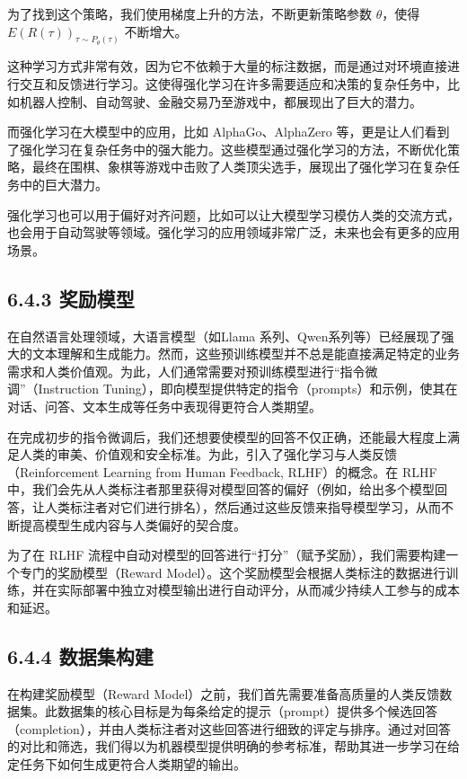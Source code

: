 \documentclass[
]{article}
\begin{document}
为了找到这个策略，我们使用梯度上升的方法，不断更新策略参数
\(\theta\)，使得 \(E(R(\tau))_{\tau \sim P_{\theta}(\tau)}\) 不断增大。

这种学习方式非常有效，因为它不依赖于大量的标注数据，而是通过对环境直接进行交互和反馈进行学习。这使得强化学习在许多需要适应和决策的复杂任务中，比如机器人控制、自动驾驶、金融交易乃至游戏中，都展现出了巨大的潜力。

而强化学习在大模型中的应用，比如 AlphaGo、AlphaZero
等，更是让人们看到了强化学习在复杂任务中的强大能力。这些模型通过强化学习的方法，不断优化策略，最终在围棋、象棋等游戏中击败了人类顶尖选手，展现出了强化学习在复杂任务中的巨大潜力。

强化学习也可以用于偏好对齐问题，比如可以让大模型学习模仿人类的交流方式，也会用于自动驾驶等领域。强化学习的应用领域非常广泛，未来也会有更多的应用场景。

\subsection{6.4.3 奖励模型}\label{ux5956ux52b1ux6a21ux578b}

在自然语言处理领域，大语言模型（如Llama
系列、Qwen系列等）已经展现了强大的文本理解和生成能力。然而，这些预训练模型并不总是能直接满足特定的业务需求和人类价值观。为此，人们通常需要对预训练模型进行``指令微调''（Instruction
Tuning），即向模型提供特定的指令（prompts）和示例，使其在对话、问答、文本生成等任务中表现得更符合人类期望。

在完成初步的指令微调后，我们还想要使模型的回答不仅正确，还能最大程度上满足人类的审美、价值观和安全标准。为此，引入了强化学习与人类反馈（Reinforcement
Learning from Human Feedback, RLHF）的概念。在 RLHF
中，我们会先从人类标注者那里获得对模型回答的偏好（例如，给出多个模型回答，让人类标注者对它们进行排名），然后通过这些反馈来指导模型学习，从而不断提高模型生成内容与人类偏好的契合度。

为了在 RLHF
流程中自动对模型的回答进行``打分''（赋予奖励），我们需要构建一个专门的奖励模型（Reward
Model）。这个奖励模型会根据人类标注的数据进行训练，并在实际部署中独立对模型输出进行自动评分，从而减少持续人工参与的成本和延迟。

\subsection{6.4.4 数据集构建}\label{ux6570ux636eux96c6ux6784ux5efa}

在构建奖励模型（Reward
Model）之前，我们首先需要准备高质量的人类反馈数据集。此数据集的核心目标是为每条给定的提示（prompt）提供多个候选回答（completion），并由人类标注者对这些回答进行细致的评定与排序。通过对回答的对比和筛选，我们得以为机器模型提供明确的参考标准，帮助其进一步学习在给定任务下如何生成更符合人类期望的输出。
\end{document}
